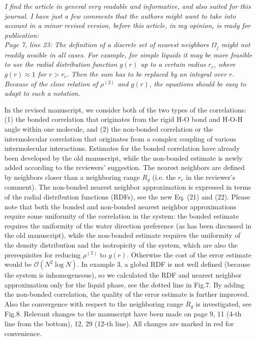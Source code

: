 \documentclass[a4paper]{article}
\begin{document}
\textit{
  I find the article in general very readable and informative, and
  also suited for this journal. I have just a few comments that the
  authors might want to take into account in a minor revised version,
  before this article, in my opinion, is ready for publication:
}\\

\textit{ Page 7, line 23: The definition of a discrete set of nearest
  neighbors $\Omega_j$ might not readily avaible in all cases. For
  example, for simple liquids it may be more feasible to use the
  radial distribution function $g(r)$ up to a certain radius $r_c$,
  where $g(r) \approx 1$ for $r > r_c$. Then the sum has to be
  replaced by an integral over $r$.  Because of the close relation of
  $\rho^{(2)}$ and $g(r)$, the equations should be easy to adapt to
  such a notation.  }

In the revised manuscript,
we consider both of the two types of the correlations:
(1) the bonded correlation
that originates from the rigid H-O
bond and H-O-H angle within one molecule,
and (2) the
non-bonded correlation or the
intermolecular correlation that originates from
a complex coupling of various intermolecular interactions.
Estimates for the bonded correlation
have already been developed by the old manuscript,
while the non-bonded estimate
is newly added according to the reviewers' suggestion.
The nearest neighbors are defined by neighbors closer than
a neighboring range $R_g$ (i.e. the $r_c$ in the reviewer's comment).
The non-bonded nearest neighbor approximation 
is expressed in terms of the radial distribution
functions (RDFs), see the new Eq. (21) and (22).
Please note that
both the bonded and non-bonded nearest neighbor approximations
require some uniformity of the correlation in the system:
the bonded estimate requires the uniformity of the water
direction preference (as has been discussed in the old manuscript),
while the non-bonded estimate requires the uniformity
of the density distribution and the isotropicity of the system, which
are also the prerequisites for reducing $\rho^{(2)}$ to $g(r)$.
Otherwise the cost of the error estimate would be $\mathcal O(N^2\log N)$.
In example 3, a global RDF is not well defined (because the system is inhomogeneous),
so we calculated the RDF and nearest neighbor approximation
only for the liquid phase, see the dotted line in Fig.7. By adding
the non-bonded correlation, the quality of the error estimate
is further improved.
Also the convergence with respect to
the neighboring range $R_g$ is investigated, see Fig.8.
Relevant changes to the manuscript
have been made on page 9,
11 (4-th line from the bottom), 12, 29 (12-th line). All changes are marked 
in red for convenience.
\\
\end{document}
